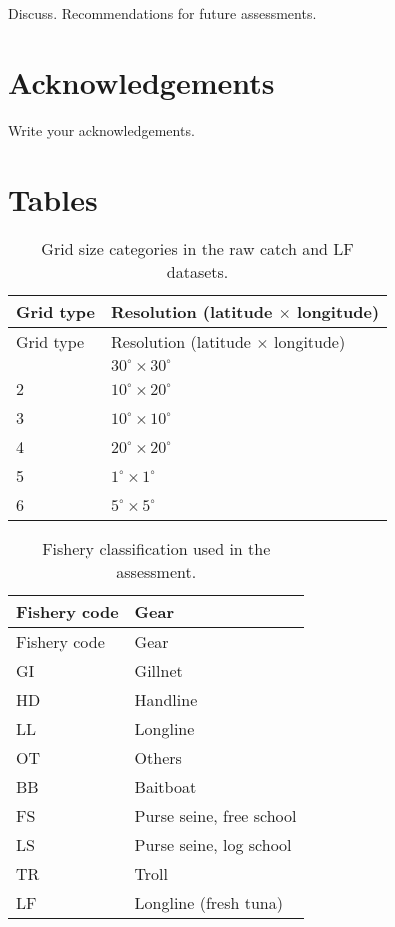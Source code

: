 \documentclass[
]{scrartcl}
\begin{document}
Discuss. Recommendations for future assessments.

\section{Acknowledgements}\label{acknowledgements}

Write your acknowledgements.

\newpage{}

\section{Tables}\label{tables}

\begin{longtable}[]{@{}ll@{}}
\caption{Grid size categories in the raw catch and LF
datasets.}\label{tbl-grid-size}\tabularnewline
\toprule\noalign{}
Grid type & Resolution (latitude \(\times\) longitude) \\
\midrule\noalign{}
\endfirsthead
\toprule\noalign{}
Grid type & Resolution (latitude \(\times\) longitude) \\
\midrule\noalign{}
\endhead
\bottomrule\noalign{}
\endlastfoot
1 & \(30^\circ\times 30^\circ\) \\
2 & \(10^\circ\times 20^\circ\) \\
3 & \(10^\circ\times 10^\circ\) \\
4 & \(20^\circ\times 20^\circ\) \\
5 & \(1^\circ\times 1^\circ\) \\
6 & \(5^\circ\times 5^\circ\) \\
\end{longtable}

\newpage{}

\begin{longtable}[]{@{}ll@{}}
\caption{Fishery classification used in the
assessment.}\label{tbl-fishery-codes}\tabularnewline
\toprule\noalign{}
Fishery code & Gear \\
\midrule\noalign{}
\endfirsthead
\toprule\noalign{}
Fishery code & Gear \\
\midrule\noalign{}
\endhead
\bottomrule\noalign{}
\endlastfoot
GI & Gillnet \\
HD & Handline \\
LL & Longline \\
OT & Others \\
BB & Baitboat \\
FS & Purse seine, free school \\
LS & Purse seine, log school \\
TR & Troll \\
LF & Longline (fresh tuna) \\
\end{longtable}
\end{document}
